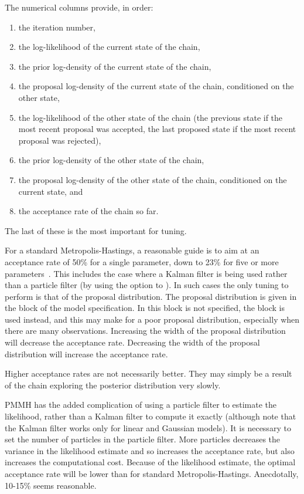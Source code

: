 The numerical columns provide, in order:
\begin{enumerate}
\item the iteration number,
\item the log-likelihood of the current state of the chain,
\item the prior log-density of the current state of the chain,
\item the proposal log-density of the current state of the chain, conditioned
  on the other state,
\item the log-likelihood of the other state of the chain (the previous state
  if the most recent proposal was accepted, the last proposed state if the
  most recent proposal was rejected),
\item the prior log-density of the other state of the chain,
\item the proposal log-density of the other state of the chain, conditioned on
  the current state, and
\item the acceptance rate of the chain so far.
\end{enumerate}
The last of these is the most important for tuning.

For a standard Metropolis-Hastings, a reasonable guide is to aim at an
acceptance rate of 50\% for a single parameter, down to 23\% for five or more
parameters~\citep{Gelman1994}. This includes the case where a Kalman filter is
being used rather than a particle filter (by using the 
option to ). In such cases the only tuning to perform is
that of the proposal distribution. The proposal distribution is given in the
 block of the model specification. In this block
is not specified, the  block is used instead, and this may
make for a poor proposal distribution, especially when there are many
observations. Increasing the width of the proposal distribution will decrease
the acceptance rate. Decreasing the width of the proposal distribution will
increase the acceptance rate.

\begin{tip}
Higher acceptance rates are not necessarily better. They may simply be a
result of the chain exploring the posterior distribution very slowly.
\end{tip}

PMMH has the added complication of using a particle filter to estimate the
likelihood, rather than a Kalman filter to compute it exactly (although note
that the Kalman filter works only for linear and Gaussian models). It is
necessary to set the number of particles in the particle filter. More
particles decreases the variance in the likelihood estimate and so increases
the acceptance rate, but also increases the computational cost. Because of the
likelihood estimate, the optimal acceptance rate will be lower than for
standard Metropolis-Hastings. Anecdotally, 10-15\% seems reasonable.

